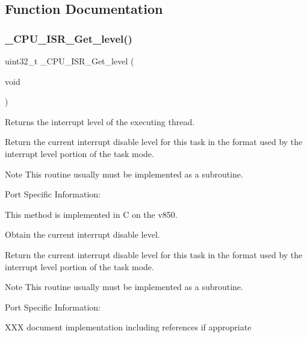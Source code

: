 \subsection{Function Documentation}
\mbox{\label{group__RTEMSScoreCPUV850CPUInterrupt_ga1d9dcab9170d532b6634a5620385adbd}} 
\subsubsection{\texorpdfstring{\_CPU\_ISR\_Get\_level()}{\_CPU\_ISR\_Get\_level()}}
{\footnotesize\ttfamily uint32\+\_\+t \+\_\+\+C\+P\+U\+\_\+\+I\+S\+R\+\_\+\+Get\+\_\+level (\begin{DoxyParamCaption}\item[{void}]{ }\end{DoxyParamCaption})}



Returns the interrupt level of the executing thread. 

Return the current interrupt disable level for this task in the format used by the interrupt level portion of the task mode.

\begin{DoxyNote}{Note}
This routine usually must be implemented as a subroutine.
\end{DoxyNote}
Port Specific Information\+:

This method is implemented in C on the v850.

Obtain the current interrupt disable level.

Return the current interrupt disable level for this task in the format used by the interrupt level portion of the task mode.

\begin{DoxyNote}{Note}
This routine usually must be implemented as a subroutine.
\end{DoxyNote}
Port Specific Information\+:

X\+XX document implementation including references if appropriate \mbox{\label{group__RTEMSScoreCPUV850CPUInterrupt_ga5254669b54a06e96ebb585fd50a02c4d}} 

